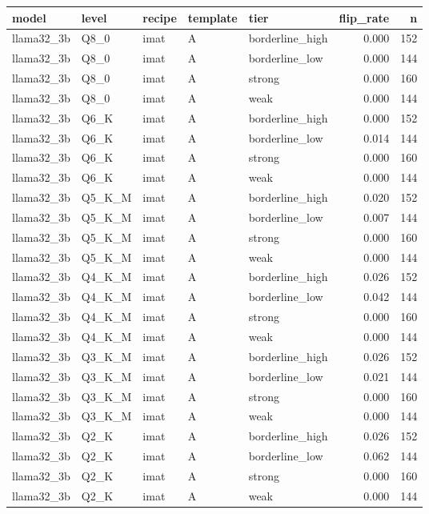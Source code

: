 \begin{tabular}{lllllrr}
\toprule
model & level & recipe & template & tier & flip\_rate & n \\
\midrule
llama32\_3b & Q8\_0 & imat & A & borderline\_high & 0.000 & 152 \\
llama32\_3b & Q8\_0 & imat & A & borderline\_low & 0.000 & 144 \\
llama32\_3b & Q8\_0 & imat & A & strong & 0.000 & 160 \\
llama32\_3b & Q8\_0 & imat & A & weak & 0.000 & 144 \\
llama32\_3b & Q6\_K & imat & A & borderline\_high & 0.000 & 152 \\
llama32\_3b & Q6\_K & imat & A & borderline\_low & 0.014 & 144 \\
llama32\_3b & Q6\_K & imat & A & strong & 0.000 & 160 \\
llama32\_3b & Q6\_K & imat & A & weak & 0.000 & 144 \\
llama32\_3b & Q5\_K\_M & imat & A & borderline\_high & 0.020 & 152 \\
llama32\_3b & Q5\_K\_M & imat & A & borderline\_low & 0.007 & 144 \\
llama32\_3b & Q5\_K\_M & imat & A & strong & 0.000 & 160 \\
llama32\_3b & Q5\_K\_M & imat & A & weak & 0.000 & 144 \\
llama32\_3b & Q4\_K\_M & imat & A & borderline\_high & 0.026 & 152 \\
llama32\_3b & Q4\_K\_M & imat & A & borderline\_low & 0.042 & 144 \\
llama32\_3b & Q4\_K\_M & imat & A & strong & 0.000 & 160 \\
llama32\_3b & Q4\_K\_M & imat & A & weak & 0.000 & 144 \\
llama32\_3b & Q3\_K\_M & imat & A & borderline\_high & 0.026 & 152 \\
llama32\_3b & Q3\_K\_M & imat & A & borderline\_low & 0.021 & 144 \\
llama32\_3b & Q3\_K\_M & imat & A & strong & 0.000 & 160 \\
llama32\_3b & Q3\_K\_M & imat & A & weak & 0.000 & 144 \\
llama32\_3b & Q2\_K & imat & A & borderline\_high & 0.026 & 152 \\
llama32\_3b & Q2\_K & imat & A & borderline\_low & 0.062 & 144 \\
llama32\_3b & Q2\_K & imat & A & strong & 0.000 & 160 \\
llama32\_3b & Q2\_K & imat & A & weak & 0.000 & 144 \\

\end{tabular}
